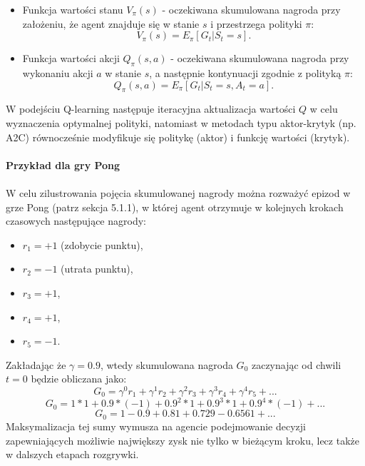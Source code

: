 \documentclass[a4paper, 12pt]{article}
\numberwithin{equation}{section}
\begin{document}
    \begin{itemize}
        \item Funkcja wartości stanu \( V_\pi(s) \) - oczekiwana skumulowana nagroda przy założeniu, że agent znajduje się w stanie \( s \) i przestrzega polityki \( \pi \):
        \begin{equation}
        V_\pi(s) = E_\pi[G_t|S_t=s].
        \end{equation}
        \item Funkcja wartości akcji \( Q_\pi(s,a) \) - oczekiwana skumulowana nagroda przy wykonaniu akcji \( a \) w stanie \( s \), a następnie kontynuacji zgodnie z polityką \( \pi \):
        \begin{equation}
        Q_\pi(s,a) = E_\pi[G_t|S_t=s,A_t=a] .
        \end{equation}
    \end{itemize}
    W podejściu Q-learning następuje iteracyjna aktualizacja wartości \( Q \) w celu wyznaczenia optymalnej polityki,
    natomiast w metodach typu aktor-krytyk (np. A2C) równocześnie modyfikuje się politykę (aktor) i funkcję wartości (krytyk).
    \\ \\ 
    \textbf{Przykład dla gry Pong}
    \\ \\ 
    W celu zilustrowania pojęcia skumulowanej nagrody można rozważyć epizod w grze Pong (patrz sekcja 5.1.1), w której agent otrzymuje w kolejnych krokach czasowych następujące nagrody:    \begin{itemize}
        \item \( r_1 = +1 \) (zdobycie punktu),
        \item \( r_2 = -1 \) (utrata punktu),
        \item \( r_3 = +1 \),
        \item \( r_4 = +1 \),
        \item \( r_5 = -1 \).
    \end{itemize}
    Zakładając że \( \gamma = 0.9 \), wtedy skumulowana nagroda \( G_0 \) zaczynając od chwili \( t = 0 \) będzie obliczana jako:
    \[ G_0 = \gamma^0r_1 + \gamma^1r_2 + \gamma^2r_3 + \gamma^3r_4 + \gamma^4r_5 + ... \]
    \[ G_0 = 1 * 1 + 0.9 * (-1) + 0.9^2 * 1 + 0.9^3 * 1 + 0.9^4 * (-1) + ... \]
    \[ G_0 = 1 - 0.9 + 0.81 + 0.729 - 0.6561 + ... \]
    Maksymalizacja tej sumy wymusza na agencie podejmowanie decyzji zapewniających możliwie największy zysk nie tylko w bieżącym kroku, lecz także w dalszych etapach rozgrywki.
\end{document}
